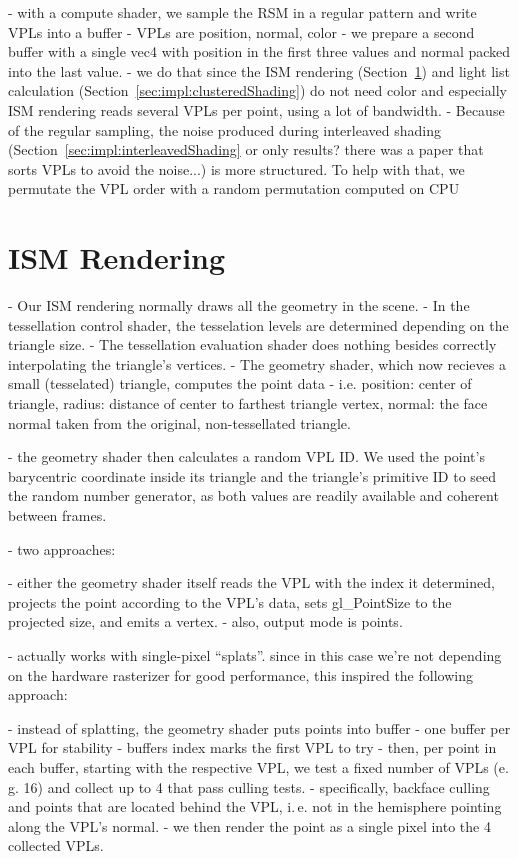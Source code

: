 - with a compute shader, we sample the RSM in a regular pattern and write VPLs into a buffer
- VPLs are position, normal, color
- we prepare a second buffer with a single vec4 with position in the first three values and normal packed into the last value.
- we do that since the ISM rendering (Section~\ref{sec:impl:ismRendering}) and light list calculation (Section~\ref{sec:impl:clusteredShading}) do not need color and especially ISM rendering reads several VPLs per point, using a lot of bandwidth.
- Because of the regular sampling, the noise produced during interleaved shading (Section~\ref{sec:impl:interleavedShading} or only results? there was a paper that sorts VPLs to avoid the noise...) is more structured. To help with that, we permutate the VPL order with a random permutation computed on CPU

\section{ISM Rendering}
\label{sec:impl:ismRendering}
- Our ISM rendering normally draws all the geometry in the scene.
- In the tessellation control shader, the tesselation levels are determined depending on the triangle size.
- The tessellation evaluation shader does nothing besides correctly interpolating the triangle's vertices.
- The geometry shader, which now recieves a small (tesselated) triangle, computes the point data
- i.e. position: center of triangle, radius: distance of center to farthest triangle vertex, normal: the face normal taken from the original, non-tessellated triangle.

- the geometry shader then calculates a random VPL ID. We used the point's barycentric coordinate inside its triangle and the triangle's primitive ID to seed the random number generator, as both values are readily available and coherent between frames.

- two approaches:

- either the geometry shader itself reads the VPL with the index it determined, projects the point according to the VPL's data, sets gl\_PointSize to the projected size, and emits a vertex.
- also, output mode is points.

- \citet{Marroquim:2007:reconstruction} actually works with single-pixel ``splats''. since in this case we're not depending on the hardware rasterizer for good performance, this inspired the following approach:

- instead of splatting, the geometry shader puts points into buffer
- one buffer per VPL for stability
- buffers index marks the first VPL to try
- then, per point in each buffer, starting with the respective VPL, we test a fixed number of VPLs (e.\,g. 16) and collect up to 4 that pass culling tests.
- specifically, backface culling and points that are located behind the VPL, i.\,e. not in the hemisphere pointing along the VPL's normal.
- we then render the point as a single pixel into the 4 collected VPLs.

